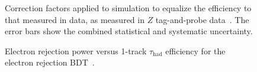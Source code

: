 \begin{figure}[htbp]
	\centering
	\caption{Correction factors applied to simulation to equalize the efficiency to that measured in data, as measured in $Z$ tag-and-probe data~\cite{TheATLASCollaboration:2015be}. The error bars show the combined statistical and systematic uncertainty.}
	\label{fig:reco-tau-efficiency-scale-factors}
\end{figure}

\begin{figure}
	\centering
	\caption{Electron rejection power versus 1-track $\tau_{\mathrm{had}}$ efficiency for the electron rejection BDT~\cite{TheATLASCollaboration:2015be}. }
	\label{fig:reco-tau-electron-rejection-efficiency}
\end{figure}

